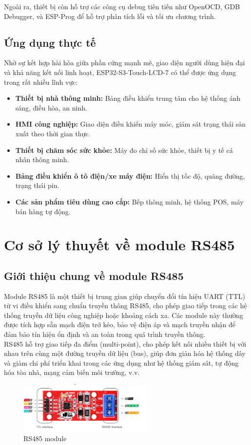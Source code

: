 \tab Ngoài ra, thiết bị còn hỗ trợ các công cụ debug tiên tiến như OpenOCD, GDB Debugger, và ESP-Prog để hỗ trợ phân tích lỗi và tối ưu chương trình.

\subsection{Ứng dụng thực tế}
\tab Nhờ sự kết hợp hài hòa giữa phần cứng mạnh mẽ, giao diện người dùng hiện đại và khả năng kết nối linh hoạt, ESP32-S3-Touch-LCD-7 có thể được ứng dụng trong rất nhiều lĩnh vực:

\begin{itemize} 
  \item \textbf{Thiết bị nhà thông minh:} Bảng điều khiển trung tâm cho hệ thống ánh sáng, điều hòa, an ninh. 
  \item \textbf{HMI công nghiệp:} Giao diện điều khiển máy móc, giám sát trạng thái sản xuất theo thời gian thực. 
  \item \textbf{Thiết bị chăm sóc sức khỏe:} Máy đo chỉ số sức khỏe, thiết bị y tế cá nhân thông minh. 
  \item \textbf{Bảng điều khiển ô tô điện/xe máy điện:} Hiển thị tốc độ, quãng đường, trạng thái pin. 
  \item \textbf{Các sản phẩm tiêu dùng cao cấp:} Bếp thông minh, hệ thống POS, máy bán hàng tự động. 
\end{itemize}
\section{Cơ sở lý thuyết về module RS485}
\subsection{Giới thiệu chung về module RS485} 
\tab Module RS485 là một thiết bị trung gian giúp chuyển đổi tín hiệu UART (TTL) từ vi điều khiển sang chuẩn truyền thông RS485, cho phép giao tiếp trong các hệ thống truyền dữ liệu công nghiệp hoặc khoảng cách xa. Các module này thường được tích hợp sẵn mạch điện trở kéo, bảo vệ điện áp và mạch truyền nhận để đảm bảo tín hiệu ổn định và an toàn trong quá trình truyền thông.\\
\tab RS485 hỗ trợ giao tiếp đa điểm (multi-point), cho phép kết nối nhiều thiết bị với nhau trên cùng một đường truyền dữ liệu (bus), giúp đơn giản hóa hệ thống dây và giảm chi phí triển khai trong các ứng dụng như hệ thống giám sát, tự động hóa tòa nhà, mạng cảm biến môi trường, v.v.
\begin{figure}[H]
  \centering
  \includegraphics[width=0.6\textwidth]{Images/RS485.png}
  \caption{RS485 module}
\end{figure}
